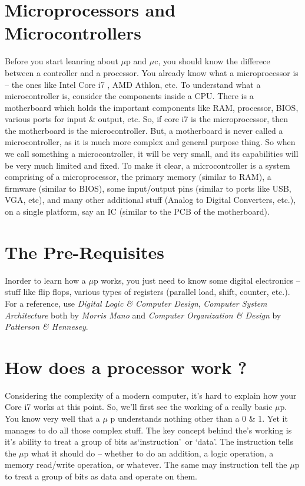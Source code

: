 \documentclass{book}
\begin{document}
\section{Microprocessors and Microcontrollers}
Before you start leanring about $\mu$p and $\mu$c, you should know the differece
between a controller and a processor. You already know what a microprocessor is
-- the ones like Intel Core i7 , AMD Athlon, etc. To understand what a
microcontroller is, consider the components inside a CPU. There is a motherboard
which holds the important components like RAM, processor, BIOS, various ports
for input \& output, etc. So, if core i7 is the microprocessor, then the
motherboard is the microcontroller. But, a motherboard is never called a
microcontroller, as it is much more complex and general purpose thing. So when
we call something a microcontroller, it will be very small, and its capabilities
will be very much limited and fixed. To make it clear, a microcontroller is a
system
comprising of a microprocessor, the primary memory (similar to RAM), a firmware
(similar to BIOS), some input/output pins (similar to ports like USB, VGA, etc),
and many other additional stuff (Analog to Digital Converters, etc.), on a
single platform, say an IC (similar to the PCB of the motherboard).

\section*{The Pre-Requisites}

Inorder to learn how a $\mu$p works, you just need to know some digital
electronics -- stuff like flip flops, various types of registers (parallel load,
shift, counter, etc.). For a reference, use \emph{Digital Logic \&
Computer Design}, \emph{Computer System Architecture} both by \emph{Morris Mano}
and \emph{Computer Organization \& Design} by \emph{Patterson \& Hennesey}.


\section{How does a processor work ?}

Considering the complexity of a modern computer, it\rq s hard to explain how
your
Core i7 works at this point. So, we\rq ll first see the working of a really
basic $\mu$p. You know very well
that a $\mu$ p understands nothing other than a 0 \& 1. Yet it manages to do all
those
complex stuff. The key concept behind the\rq s working is it\rq s ability to
treat a group of
bits as\lq instruction\rq\ or \lq data\rq. The instruction tells the $\mu$p what
it
should do -- whether to do an addition, a logic operation, a memory read/write
operation, or whatever.
The same may instruction tell the $\mu$p to treat a group of bits as data and
operate on them. 
\end{document}

